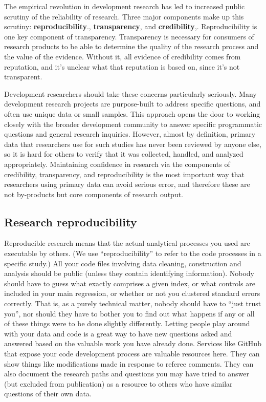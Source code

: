 The empirical revolution in development research
has led to increased public scrutiny of the reliability of research.\cite{rogers_2017}
Three major components make up this scrutiny: \textbf{reproducibility}.\cite{duvendack2017meant}, \textbf{transparency},\cite{christensen2018transparency} and \textbf{credibility},\cite{ioannidis2017power}.
Reproducibility is one key component of transparency.
Transparency is necessary for consumers of research products
to be able to determine the quality of the research process and the value of the evidence.
Without it, all evidence of credibility comes from reputation,
and it's unclear what that reputation is based on, since it's not transparent.

Development researchers should take these concerns particularly seriously.
Many development research projects are purpose-built to address specific questions,
and often use unique data or small samples.
This approach opens the door to working closely with the broader development community
to answer specific programmatic questions and general research inquiries.
However, almost by definition,
primary data that researchers use for such studies has never been reviewed by anyone else,
so it is hard for others to verify that it was collected, handled, and analyzed appropriately.
Maintaining confidence in research via the components of credibility, transparency, and reproducibility
is the most important way that researchers using primary data can avoid serious error,
and therefore these are not by-products but core components of research output.

\subsection{Research reproducibility}

Reproducible research means that the actual analytical processes you used are executable by others.\cite{dafoe2014science}
(We use ``reproducibility'' to refer to the code processes in a specific study.)
All your code files involving data cleaning, construction and analysis
should be public (unless they contain identifying information).
Nobody should have to guess what exactly comprises a given index,
or what controls are included in your main regression,
or whether or not you clustered standard errors correctly.
That is, as a purely technical matter, nobody should have to ``just trust you'',
nor should they have to bother you to find out what happens
if any or all of these things were to be done slightly differently.\cite{simmons2011false,wicherts2016degrees}
Letting people play around with your data and code is a great way to have new questions asked and answered
based on the valuable work you have already done.
Services like GitHub that expose your code development process are valuable resources here.
They can show things like modifications made in response to referee comments.
They can also document the research paths and questions you may have tried to answer
(but excluded from publication)
as a resource to others who have similar questions of their own data.

